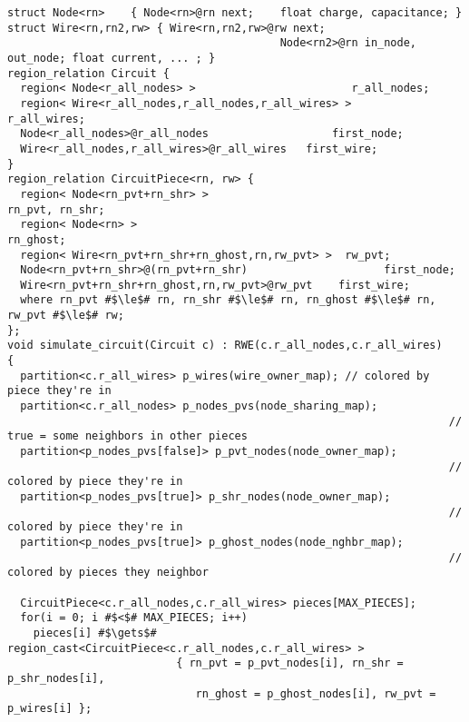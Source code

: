 \begin{lstlisting}[float={t},label={lst:code_ex},caption={Circuit Simulation Code Example}]
struct Node<rn>    { Node<rn>@rn next;    float charge, capacitance; }
struct Wire<rn,rn2,rw> { Wire<rn,rn2,rw>@rw next;
                                          Node<rn2>@rn in_node, out_node; float current, ... ; }
region_relation Circuit {
  region< Node<r_all_nodes> >                        r_all_nodes;
  region< Wire<r_all_nodes,r_all_nodes,r_all_wires> >       r_all_wires;
  Node<r_all_nodes>@r_all_nodes                   first_node;
  Wire<r_all_nodes,r_all_wires>@r_all_wires   first_wire;
}
region_relation CircuitPiece<rn, rw> {
  region< Node<rn_pvt+rn_shr> >                                 rn_pvt, rn_shr;
  region< Node<rn> >                                                   rn_ghost;
  region< Wire<rn_pvt+rn_shr+rn_ghost,rn,rw_pvt> >  rw_pvt;
  Node<rn_pvt+rn_shr>@(rn_pvt+rn_shr)                     first_node;
  Wire<rn_pvt+rn_shr+rn_ghost,rn,rw_pvt>@rw_pvt    first_wire;
  where rn_pvt #$\le$# rn, rn_shr #$\le$# rn, rn_ghost #$\le$# rn, rw_pvt #$\le$# rw;
};
void simulate_circuit(Circuit c) : RWE(c.r_all_nodes,c.r_all_wires)
{
  partition<c.r_all_wires> p_wires(wire_owner_map); // colored by piece they're in
  partition<c.r_all_nodes> p_nodes_pvs(node_sharing_map);
                                                                    // true = some neighbors in other pieces
  partition<p_nodes_pvs[false]> p_pvt_nodes(node_owner_map);
                                                                    // colored by piece they're in
  partition<p_nodes_pvs[true]> p_shr_nodes(node_owner_map);
                                                                    // colored by piece they're in
  partition<p_nodes_pvs[true]> p_ghost_nodes(node_nghbr_map);
                                                                    // colored by pieces they neighbor

  CircuitPiece<c.r_all_nodes,c.r_all_wires> pieces[MAX_PIECES];
  for(i = 0; i #$<$# MAX_PIECES; i++) 
    pieces[i] #$\gets$# region_cast<CircuitPiece<c.r_all_nodes,c.r_all_wires> >
                          { rn_pvt = p_pvt_nodes[i], rn_shr = p_shr_nodes[i],
                             rn_ghost = p_ghost_nodes[i], rw_pvt = p_wires[i] };


\end{lstlisting}
